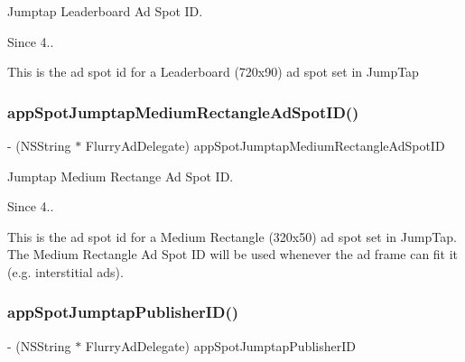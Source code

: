 Jumptap Leaderboard Ad Spot ID. 

\begin{DoxySince}{Since}
4..
\end{DoxySince}
This is the ad spot id for a Leaderboard (720x90) ad spot set in Jump\+Tap \mbox{\label{protocolFlurryAdDelegate_01-p_a929633c2f77ecc7bc030e01663d9e312}} 
\subsubsection{\texorpdfstring{app\+Spot\+Jumptap\+Medium\+Rectangle\+Ad\+Spot\+I\+D()}{appSpotJumptapMediumRectangleAdSpotID()}}
{\footnotesize\ttfamily -\/ (N\+S\+String $\ast$ Flurry\+Ad\+Delegate) app\+Spot\+Jumptap\+Medium\+Rectangle\+Ad\+Spot\+ID \begin{DoxyParamCaption}{ }\end{DoxyParamCaption}}



Jumptap Medium Rectange Ad Spot ID. 

\begin{DoxySince}{Since}
4..
\end{DoxySince}
This is the ad spot id for a Medium Rectangle (320x50) ad spot set in Jump\+Tap. The Medium Rectangle Ad Spot ID will be used whenever the ad frame can fit it (e.\+g. interstitial ads). \mbox{\label{protocolFlurryAdDelegate_01-p_aa47f249e8a0aeeb33395e5edd0aaf626}} 
\subsubsection{\texorpdfstring{app\+Spot\+Jumptap\+Publisher\+I\+D()}{appSpotJumptapPublisherID()}}
{\footnotesize\ttfamily -\/ (N\+S\+String $\ast$ Flurry\+Ad\+Delegate) app\+Spot\+Jumptap\+Publisher\+ID \begin{DoxyParamCaption}{ }\end{DoxyParamCaption}}




